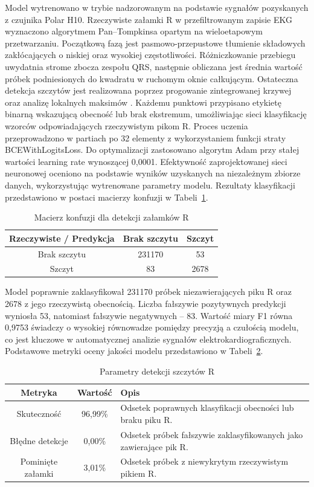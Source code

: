 \documentclass[journal]{IEEEtran}
\begin{document}
{Model wytrenowano w trybie nadzorowanym na podstawie sygnałów pozyskanych z czujnika Polar H10. Rzeczywiste załamki R w przefiltrowanym zapisie EKG wyznaczono algorytmem Pan–Tompkinsa opartym na wieloetapowym przetwarzaniu. Początkową fazą jest pasmowo-przepustowe tłumienie składowych zakłócających o niskiej oraz wysokiej częstotliwości. Różniczkowanie przebiegu uwydatnia strome zbocza zespołu QRS, następnie obliczana jest średnia wartość próbek podniesionych do kwadratu w ruchomym oknie całkującym. Ostateczna detekcja szczytów jest realizowana poprzez progowanie zintegrowanej krzywej oraz analizę lokalnych maksimów \cite{27}.
Każdemu punktowi przypisano etykietę binarną wskazującą obecność lub brak ekstremum, umożliwiając sieci klasyfikację wzorców odpowiadających rzeczywistym pikom R. 
\newpage
Proces uczenia przeprowadzono w partiach po 32 elementy z wykorzystaniem funkcji straty BCEWithLogitsLoss. Do optymalizacji zastosowano algorytm Adam przy stałej wartości learning rate wynoszącej 0,0001. Efektywność zaprojektowanej sieci neuronowej oceniono na podstawie wyników uzyskanych na niezależnym zbiorze danych, wykorzystując wytrenowane parametry modelu. Rezultaty klasyfikacji przedstawiono w postaci macierzy konfuzji w Tabeli~\ref{tab:conf_matrix}.

\begin{table}[ht]
\centering
\caption{Macierz konfuzji dla detekcji załamków R}
\label{tab:conf_matrix}
\begin{tabular}{|c|c|c|}
\hline
\textbf{Rzeczywiste / Predykcja} & \textbf{Brak szczytu } & \textbf{Szczyt } \\
\hline
Brak szczytu  & 231170 & 53 \\
Szczyt  & 83 & 2678 \\
\hline
\end{tabular}
\end{table}

Model poprawnie zaklasyfikował 231170 próbek niezawierających piku R oraz 2678 z jego rzeczywistą obecnością. Liczba fałszywie pozytywnych predykcji wyniosła 53, natomiast fałszywie negatywnych -- 83. Wartość miary F1 równa 0,9753 świadczy o wysokiej równowadze pomiędzy precyzją a czułością modelu, co jest kluczowe w automatycznej analizie sygnałów elektrokardiograficznych. Podstawowe metryki oceny jakości modelu przedstawiono w Tabeli~\ref{tab:metrics}.

\begin{table}[ht]
\centering
\caption{Parametry detekcji szczytów R}
\label{tab:metrics}
\begin{tabular}{|c|c|p{4.6cm}|}
\hline
\textbf{Metryka} & \textbf{Wartość} & \textbf{Opis} \\
\hline
Skuteczność & 96,99\% & Odsetek poprawnych klasyfikacji obecności lub braku piku R. \\
Błędne detekcje & 0,00\% & Odsetek próbek fałszywie zaklasyfikowanych jako zawierające pik R. \\
Pominięte załamki & 3,01\% & Odsetek próbek z niewykrytym rzeczywistym pikiem R. \\
\hline
\end{tabular}
\end{table}

}
\end{document}
